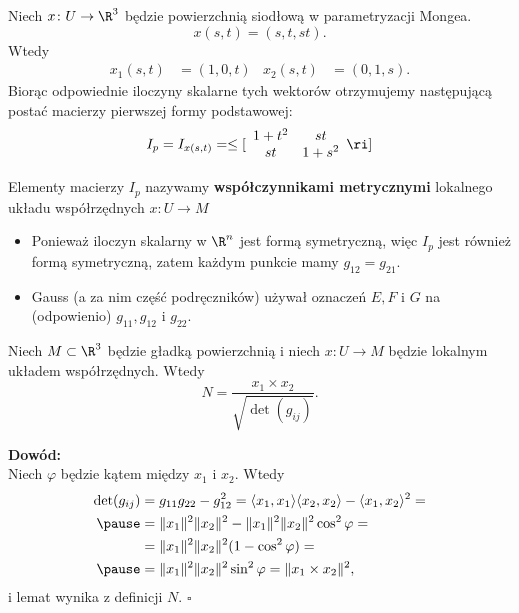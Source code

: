 \begin{frame}
\begin{przyklad}
Niech $x\colon U\to \R^3$ będzie powierzchnią siodłową w parametryzacji Mongea.
\[x(s,t)=(s,t,st).\]
\pause Wtedy 
\begin{align*}
x_1(s,t)&=(1,0,t) & x_2(s,t)&=(0,1,s).
\end{align*}
\pause Biorąc odpowiednie iloczyny skalarne tych wektorów otrzymujemy następującą postać macierzy pierwszej formy podstawowej:
\pause \[
I_{p}=I_{x(s,t)}=\le[\begin{array}{cc}
1+t^2&st\\
st & 1+s^2
\end{array}\ri]
\]

\end{przyklad}


\end{frame}
\begin{frame}[<+->]


\begin{definicja}
Elementy macierzy $I_p$ nazywamy \textbf{współczynnikami metrycznymi} lokalnego układu współrzędnych $x\colon U\to M$
\end{definicja}

\begin{uwaga}
\begin{itemize}
\item Ponieważ iloczyn skalarny w $\R^n$ jest formą symetryczną, więc $I_p$ jest również formą symetryczną, zatem każdym punkcie mamy $g_{12}=g_{21}$.
\item Gauss (a za nim część podręczników) używał oznaczeń $E,F$ i $G$ na (odpowienio) $g_{11},g_{12}$ i $g_{22}$.
\end{itemize}
\end{uwaga}


\end{frame}
\begin{frame}

\begin{lemat}
Niech $M\subset \R^3$ będzie gładką powierzchnią i niech $x\colon U\to M$ będzie lokalnym układem współrzędnych. Wtedy
\[N=\frac{x_1\times x_2}{\sqrt{\det(g_{ij})}}.\]
\end{lemat}
\pause \textcolor{ared}{\textbf{Dowód:}}\\\pause
Niech $\varphi$ będzie kątem między $x_1$ i $x_2$. Wtedy
\begin{align*}
\det(g_{ij})
&= g_{11}g_{22}-g_{12}^2=\langle x_1 ,x_1\rangle\langle x_2 ,x_2\rangle-\langle x_1 ,x_2\rangle^2=\\\pause
&= \|x_1\|^2\|x_2\|^2-\|x_1\|^2\|x_2\|^2\cos^2 \varphi=\\
&=\|x_1\|^2\|x_2\|^2(1-\cos^2\varphi)=\\\pause
&= \|x_1\|^2\|x_2\|^2\sin^2\varphi= \|x_1\times x_2\|^2,
\end{align*}
i lemat wynika z definicji $N$.
\hfill $\square$
\end{frame}
